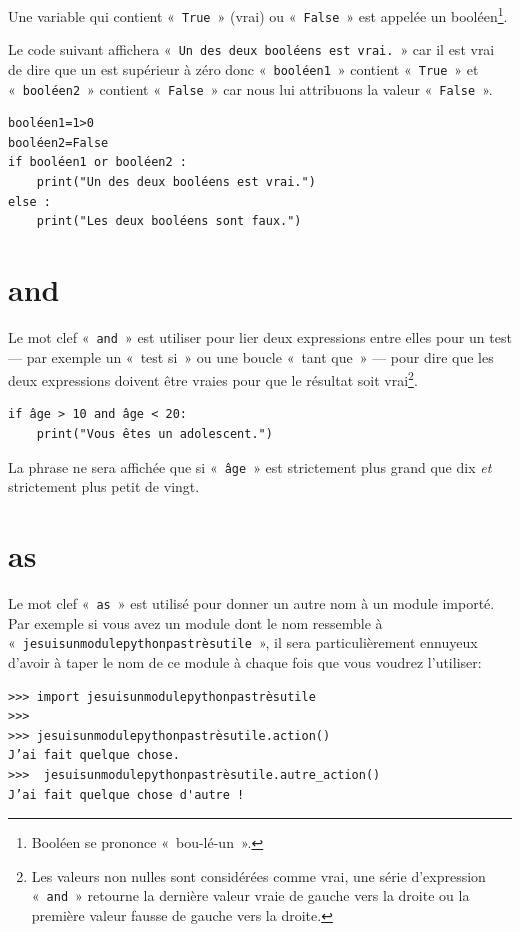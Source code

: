 Une variable qui contient «~\texttt{True}~» (vrai) ou «~\texttt{False}~» est appelée un booléen\footnote{Booléen se prononce «~bou-lé-un~».}.  

Le code suivant affichera «~\texttt{Un des deux booléens est vrai.}~» car il est vrai de dire que un est supérieur à zéro donc «~\texttt{booléen1}~» contient «~\texttt{True}~» et «~\texttt{booléen2}~» contient «~\texttt{False}~» car nous lui attribuons la valeur «~\texttt{False}~».
  
\begin{Verbatim}[frame=single,rulecolor=\color{gray}]
booléen1=1>0
booléen2=False
if booléen1 or booléen2 :
    print("Un des deux booléens est vrai.")
else :
	print("Les deux booléens sont faux.")
\end{Verbatim}

\section*{and}

Le mot clef «~\texttt{and}~» est utiliser pour lier deux expressions entre elles pour un test --- par exemple un «~test si~» ou une boucle «~tant que~» --- pour dire que les deux expressions doivent être vraies pour que le résultat soit vrai\footnote{Les valeurs non nulles sont considérées comme vrai, une série d'expression «~\texttt{and}~» retourne la dernière valeur vraie de gauche vers la droite ou la  première valeur fausse de gauche vers la droite.}.

\begin{Verbatim}[frame=single,rulecolor=\color{gray}]
if âge > 10 and âge < 20:
    print("Vous êtes un adolescent.")
\end{Verbatim}

La phrase ne sera affichée que si «~\texttt{âge}~» est strictement plus grand que dix \emph{et} strictement plus petit de vingt.

\section*{as}

Le mot clef «~\texttt{as}~» est utilisé pour donner un autre nom à un module importé. Par exemple si vous avez un module dont le nom ressemble à «~\texttt{jesuisunmodulepythonpastrèsutile}~», il sera particulièrement ennuyeux d'avoir à taper le nom de ce module à chaque fois que vous voudrez l'utiliser:
\begin{Verbatim}[frame=single,rulecolor=\color{gray}]
>>> import jesuisunmodulepythonpastrèsutile
>>>
>>> jesuisunmodulepythonpastrèsutile.action()
J’ai fait quelque chose.
>>>  jesuisunmodulepythonpastrèsutile.autre_action()
J’ai fait quelque chose d'autre !
\end{Verbatim}

